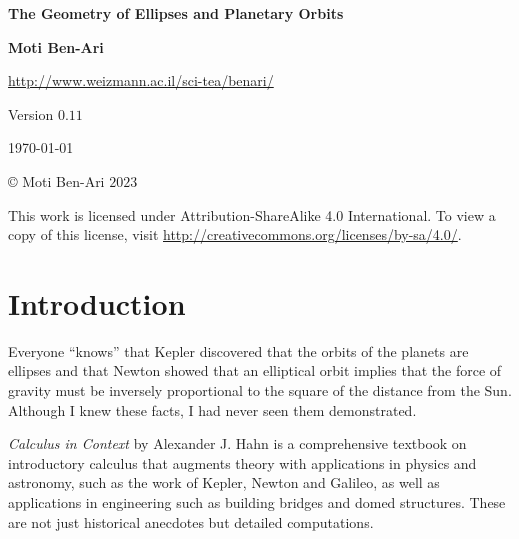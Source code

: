 


\thispagestyle{empty}

\begin{center}
\textbf{\LARGE The Geometry of Ellipses and Planetary Orbits}

\bigskip
\bigskip
\bigskip

\textbf{\Large Moti Ben-Ari}

\bigskip

\url{http://www.weizmann.ac.il/sci-tea/benari/}

\bigskip
\bigskip
\bigskip

Version $0.11$

\bigskip

\today

\end{center}

\vfill

\begin{center}
\copyright{} Moti Ben-Ari $2023$
\end{center}
 
\begin{small}
This work is licensed under Attribution-ShareAlike 4.0 International. To view a copy of this license, visit \url{http://creativecommons.org/licenses/by-sa/4.0/}.
\end{small}

\newpage

\tableofcontents

\newpage


\section{Introduction}

Everyone ``knows'' that Kepler discovered that the orbits of the planets are ellipses and that Newton showed that an elliptical orbit implies that the force of gravity must be inversely proportional to the square of the distance from the Sun. Although I knew these facts, I had never seen them demonstrated.

\textit{Calculus in Context} \cite{hahn-cic} by Alexander J. Hahn is a comprehensive textbook on introductory calculus that augments theory with  applications in physics and astronomy, such as the work of Kepler, Newton and Galileo, as well as applications in engineering such as building bridges and domed structures. These are not just historical anecdotes but detailed computations.

